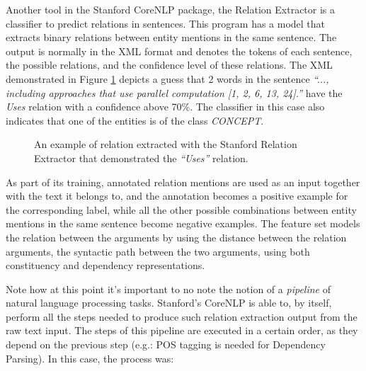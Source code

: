 \documentclass[11pt,a4paper,openright]{memoir}
\begin{document}
Another tool in the Stanford CoreNLP package, the Relation Extractor \cite{Surdeanu:2011:CIE:2021153.2021155} is a classifier to predict relations in sentences. This program has a model that extracts binary relations between entity mentions in the same sentence. The output is normally in the XML \cite{xml} format and denotes the tokens of each sentence, the possible relations, and the confidence level of these relations. The XML demonstrated in Figure \ref{fig:xml_output1} depicts a guess that 2 words in the sentence \emph{\enquote{..., including approaches that use parallel computation [1, 2, 6, 13, 24].}} have the \emph{Uses} relation with a confidence above 70\%. The classifier in this case also indicates that one of the entities is of the class \emph{CONCEPT}.

\begin{figure}[!htbp]
  \centering
    
  \caption[An example of relation extracted with the Stanford Relation Extractor.]{An example of relation extracted with the Stanford Relation Extractor that demonstrated the \emph{\enquote{Uses}} relation.}
  \label{fig:xml_output1}
\end{figure}

As part of its training, annotated relation mentions are used as an input together with the text it belongs to, and the annotation becomes a positive example for the corresponding label, while all the other possible combinations between entity mentions in the same sentence become negative examples. The feature set models the relation between the arguments by using the distance between the relation arguments, the syntactic path between the two arguments, using both constituency and dependency representations.

Note how at this point it's important to no note the notion of a \emph{pipeline} of natural language processing tasks. Stanford's CoreNLP is able to, by itself, perform all the steps needed to produce such relation extraction output from the raw text input. The steps of this pipeline are executed in a certain order, as they depend on the previous step (e.g.: POS tagging is needed for Dependency Parsing). In this case, the process was:
\end{document}
